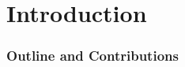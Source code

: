 \section{Introduction}
\label{sec:introduction}

\subsubsection*{Outline and Contributions}

\begin{myitemize}
    \item 
\end{myitemize}

